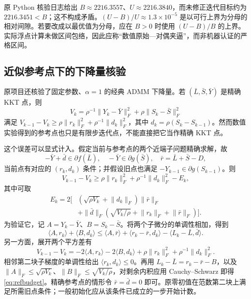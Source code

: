 \documentclass[UTF8,fontset=none,zihao=-4,a4paper]{ctexart}
\theoremstyle{plainzh}
\newcommand{\fro}[1]{\lVert #1\rVert_F}
\newcommand{\ip}[2]{\langle #1,#2\rangle}
\numberwithin{equation}{section}
\begin{document}
原 Python 核验日志给出 $B\approx2216.3557$、$U\approx2216.3840$，而未修正迭代目标约为 $2216.3451<B$；这不构成矛盾。$(U-B)/U\approx1.3\times10^{-5}$ 是以可行上界为分母的相对间隙。若要改成以最优值为分母，应在 $B>0$ 时使用 $(U-B)/B$ 的上界。实际浮点计算未做区间包络，因此应称“数值原始—对偶夹逼”，而非机器认证的严格区间。


\subsection{近似参考点下的下降量核验}
原项目还核验了固定参数、$\alpha=1$ 的经典 ADMM 下降量。若 $(\bar L,\bar S,\bar Y)$ 是精确 KKT 点，则
\begin{equation}
 V_k=\rho^{-1}\fro{Y_k-\bar Y}^2+\rho\fro{S_k-\bar S}^2
\end{equation}
满足 $V_{k-1}-V_k\geq\rho\fro{r_k}^2+\rho^{-1}\fro{d_k}^2$，其中 $d_k=\rho(S_k-S_{k-1})$。然而数值实验得到的参考点也只是有限步迭代点，不能直接把它当作精确 KKT 点。

这个误差可以显式计入。假定当前与参考点的两个近端子问题精确求解，故
\begin{equation}
 -\bar Y+\bar d\in\partial f(\bar L),\quad-\bar Y\in\partial g(\bar S),\quad
 \bar r=\bar L+\bar S-D,
\end{equation}
当前点有对应的 $(r_k,d_k)$ 条件；并假设旧点也满足 $-Y_{k-1}\in\partial g(S_{k-1})$。则
\begin{equation}\label{eq:refbudget}
 V_{k-1}-V_k\geq\rho\fro{r_k}^2+\rho^{-1}\fro{d_k}^2-E_k,
\end{equation}
其中可取
\begin{align}
 E_k=2\bigl[&(\sqrt{\rho V_k}+\fro{d_k})\fro{\bar r}\nonumber\\
 &+\fro{\bar d}(\sqrt{V_k/\rho}+\fro{r_k}+\fro{\bar r})\bigr].
\end{align}
为验证它，记 $A=Y_k-\bar Y$、$B=S_k-\bar S$。将两个子微分的单调性相加，得到
\begin{equation*}
 \ip A{r_k}+\ip B{d_k}
 \leq\ip A{\bar r}+\ip{r_k-\bar r}{d_k}
       -\ip{L_k-\bar L}{\bar d}.
\end{equation*}
另一方面，展开两个平方差有
\begin{equation*}
 V_{k-1}-V_k=-2\ip A{r_k}-2\ip B{d_k}
             +\rho\fro{r_k}^2+\rho^{-1}\fro{d_k}^2.
\end{equation*}
相邻第二块子梯度的单调性给出 $\ip{r_k}{d_k}\leq0$。再用
$L_k-\bar L=r_k-\bar r-B$，以及
$\fro A\leq\sqrt{\rho V_k}$、$\fro B\leq\sqrt{V_k/\rho}$，对剩余内积应用 Cauchy--Schwarz 即得 \eqref{eq:refbudget}。精确参考点的情形令 $\bar r=\bar d=0$ 即可。原零初值在范数第二块上满足所需旧点条件；一般初始化应从该条件已成立的一步开始计数。
\end{document}
